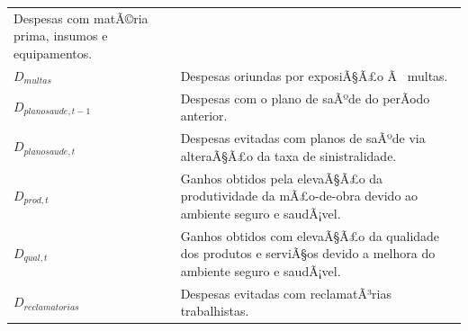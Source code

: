 \documentclass[]{article}
\begin{document}
\begin{longtable}[]{@{}ll@{}}
\begin{minipage}[t]{0.87\columnwidth}
Despesas com matÃ©ria prima, insumos e equipamentos.\strut
\end{minipage}\tabularnewline
\begin{minipage}[t]{0.07\columnwidth}\raggedright\strut
\(D_{multas}\)\strut
\end{minipage} & \begin{minipage}[t]{0.87\columnwidth}\raggedright\strut
Despesas oriundas por exposiÃ§Ã£o Ã~ multas.\strut
\end{minipage}\tabularnewline
\begin{minipage}[t]{0.07\columnwidth}\raggedright\strut
\(D_{planosaude, t-1}\)\strut
\end{minipage} & \begin{minipage}[t]{0.87\columnwidth}\raggedright\strut
Despesas com o plano de saÃºde do perÃ­odo anterior.\strut
\end{minipage}\tabularnewline
\begin{minipage}[t]{0.07\columnwidth}\raggedright\strut
\(D_{planosaude,t}\)\strut
\end{minipage} & \begin{minipage}[t]{0.87\columnwidth}\raggedright\strut
Despesas evitadas com planos de saÃºde via alteraÃ§Ã£o da taxa de
sinistralidade.\strut
\end{minipage}\tabularnewline
\begin{minipage}[t]{0.07\columnwidth}\raggedright\strut
\(D_{prod, t}\)\strut
\end{minipage} & \begin{minipage}[t]{0.87\columnwidth}\raggedright\strut
Ganhos obtidos pela elevaÃ§Ã£o da produtividade da mÃ£o-de-obra devido
ao ambiente seguro e saudÃ¡vel.\strut
\end{minipage}\tabularnewline
\begin{minipage}[t]{0.07\columnwidth}\raggedright\strut
\(D_{qual, t}\)\strut
\end{minipage} & \begin{minipage}[t]{0.87\columnwidth}\raggedright\strut
Ganhos obtidos com elevaÃ§Ã£o da qualidade dos produtos e serviÃ§os
devido a melhora do ambiente seguro e saudÃ¡vel.\strut
\end{minipage}\tabularnewline
\begin{minipage}[t]{0.07\columnwidth}\raggedright\strut
\(D_{reclamatorias}\)\strut
\end{minipage} & \begin{minipage}[t]{0.87\columnwidth}\raggedright\strut
Despesas evitadas com reclamatÃ³rias trabalhistas.\strut

\end{minipage}
\end{longtable}
\end{document}
